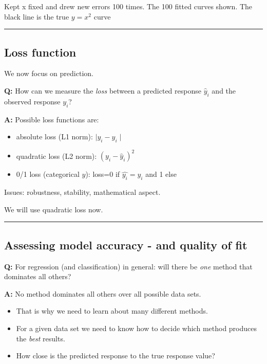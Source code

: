 \documentclass[]{article}
\providecommand{\tightlist}{%
  \setlength{\itemsep}{0pt}\setlength{\parskip}{0pt}}
\begin{document}
Kept x fixed and drew new errors 100 times. The 100 fitted curves shown.
The black line is the true \(y=x^2\) curve

\begin{center}\rule{0.5\linewidth}{\linethickness}\end{center}

\hypertarget{loss-function}{%
\subsection{Loss function}\label{loss-function}}

We now focus on prediction.

\textbf{Q:} How can we measure the \emph{loss} between a predicted
response \(\hat{y}_i\) and the observed response \(y_i\)?

\textbf{A:} Possible loss functions are:

\begin{itemize}
\tightlist
\item
  absolute loss (L1 norm): \(\mid y_i-\hat{y}_i\mid\)
\item
  quadratic loss (L2 norm): \((y_i-\hat{y}_i)^2\)
\item
  0/1 loss (categorical \(y\)): loss=0 if \(\hat{y_i}=y_i\) and 1 else
\end{itemize}

Issues: robustness, stability, mathematical aspect.

We will use quadratic loss now.

\begin{center}\rule{0.5\linewidth}{\linethickness}\end{center}

\hypertarget{assessing-model-accuracy---and-quality-of-fit}{%
\subsection{Assessing model accuracy - and quality of
fit}\label{assessing-model-accuracy---and-quality-of-fit}}

\textbf{Q:} For regression (and classification) in general: will there
be \emph{one} method that dominates all others?

\textbf{A:} No method dominates all others over all possible data sets.

\begin{itemize}
\tightlist
\item
  That is why we need to learn about many different methods.
\item
  For a given data set we need to know how to decide which method
  produces the \emph{best} results.
\item
  How close is the predicted response to the true response value?
\end{itemize}
\end{document}
